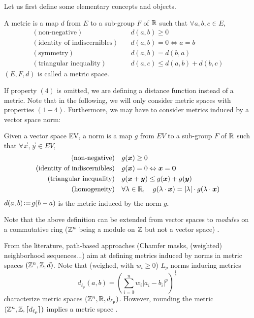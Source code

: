 \documentclass{llncs}
\begin{document}
Let us first define some elementary concepts and objects.
\begin{definition}
  \label{def:distance}
  A metric is a map $d$ from $E$ to a sub-group $F$ of ${\mathbb{R}}$ such that
  $\forall a,b,c\in E$,
  \begin{align}
    (\text{non-negative})\quad & d(a,b)\geq 0\\
    (\text{identity of indiscernibles}) \quad&  d(a,b)= 0
    \Leftrightarrow a=b\\
    (\text{symmetry})\quad &  d(a,b)=d(b,a)\\
    (\text{triangular inequality})\quad &   d(a,c) \leq d(a,b) + d(b,c)
  \end{align}
$(E, F, d)$ is called a metric space.
\end{definition}
If property $(4)$ is omitted, we are defining a distance function
instead of a metric. Note that in the following, we will only consider
metric spaces with properties $(1-4)$. Furthermore, we may have to
consider  metrics induced by a vector space norm:
\begin{definition}
  \label{def:distance}
  Given a vector space EV, a norm is a map $g$ from  $EV$ to a sub-group
  $F$ of ${\mathbb{R}}$ such that $\forall \vec{x},\vec{y}\in EV$,
  \begin{align}
    (\text{non-negative})\quad & g(\vec{x})\geq 0\\
    (\text{identity of indiscernibles}) \quad&  g(\vec{x})= 0
    \Leftrightarrow \vec{x}=\vec{0}\\
    (\text{triangular inequality})\quad &   g(\vec{x}+\vec{y}) \leq
    g(\vec{x}) + g(\vec{y})\\
    (\text{homogeneity})\quad &  \forall \lambda\in\R, \quad
    g(\lambda\cdot\vec{x}) = |\lambda|\cdot g(\lambda\cdot\vec{x})
  \end{align}
$d(a,b) \!\mathrel{\mathop:}=\! g(b-a)$ is the metric induced by the
  norm $g$.
\end{definition}
Note that the above definition can be extended from vector spaces to
\emph{modules} on a commutative ring (${\mathbb{Z}}^n$ being a module on ${\mathbb{Z}}$
but not a vector space) \cite{Thiel_hdr}.

From the literature, path-based approaches (Chamfer masks, (weighted)
neighborhood sequences...)  aim at defining metrics induced by norms
in metric spaces $({\mathbb{Z}}^n, {\mathbb{Z}} , d)$.  Note that (weighed, with $w_i\geq 0$) $L_p$ norms inducing
metrics
\begin{equation}
    d_{\ell_p} (a,b) = \left ( \sum_{i=0}^n w_i|a_i-b_i |^p \right )^{\frac{1}{p}}\,
  \end{equation}
characterize metric spaces $({\mathbb{Z}}^n, {\mathbb{R}} , d_{\ell_p})$. However,
rounding the metric $({\mathbb{Z}}^n,{\mathbb{Z}}, \lceil d_{\ell_p}\rceil)$ implies a
metric space \cite{klette_book}.
\end{document}
